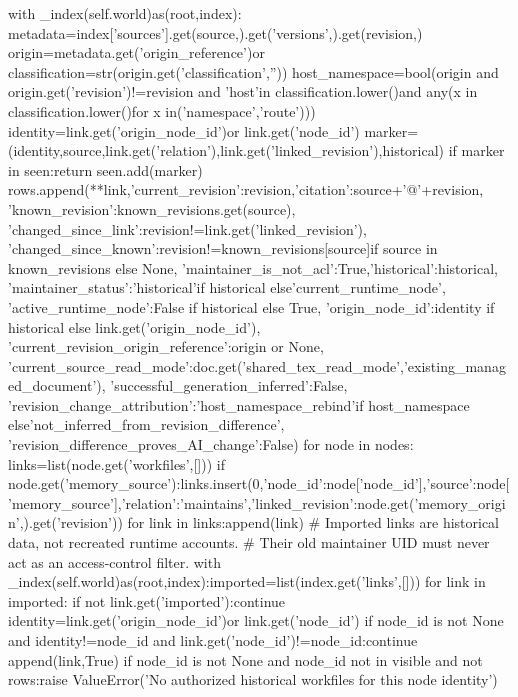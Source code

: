             with _index(self.world)as(root,index):
                metadata=index['sources'].get(source,{}).get('versions',{}).get(revision,{})
            origin=metadata.get('origin_reference')or{}
            classification=str(origin.get('classification',''))
            host_namespace=bool(origin and origin.get('revision')!=revision and 'host'in classification.lower()and any(x in classification.lower()for x in('namespace','route')))
            identity=link.get('origin_node_id')or link.get('node_id')
            marker=(identity,source,link.get('relation'),link.get('linked_revision'),historical)
            if marker in seen:return
            seen.add(marker)
            rows.append({**link,'current_revision':revision,'citation':source+'@'+revision,
                'known_revision':known_revisions.get(source),
                'changed_since_link':revision!=link.get('linked_revision'),
                'changed_since_known':revision!=known_revisions[source]if source in known_revisions else None,
                'maintainer_is_not_acl':True,'historical':historical,
                'maintainer_status':'historical'if historical else'current_runtime_node',
                'active_runtime_node':False if historical else True,
                'origin_node_id':identity if historical else link.get('origin_node_id'),
                'current_revision_origin_reference':origin or None,
                'current_source_read_mode':doc.get('shared_tex_read_mode','existing_managed_document'),
                'successful_generation_inferred':False,
                'revision_change_attribution':'host_namespace_rebind'if host_namespace else'not_inferred_from_revision_difference',
                'revision_difference_proves_AI_change':False})
        for node in nodes:
            links=list(node.get('workfiles',[]))
            if node.get('memory_source'):links.insert(0,{'node_id':node['node_id'],'source':node['memory_source'],'relation':'maintains','linked_revision':node.get('memory_origin',{}).get('revision')})
            for link in links:append(link)
        # Imported links are historical data, not recreated runtime accounts.
        # Their old maintainer UID must never act as an access-control filter.
        with _index(self.world)as(root,index):imported=list(index.get('links',[]))
        for link in imported:
            if not link.get('imported'):continue
            identity=link.get('origin_node_id')or link.get('node_id')
            if node_id is not None and identity!=node_id and link.get('node_id')!=node_id:continue
            append(link,True)
        if node_id is not None and node_id not in visible and not rows:raise ValueError('No authorized historical workfiles for this node identity')
